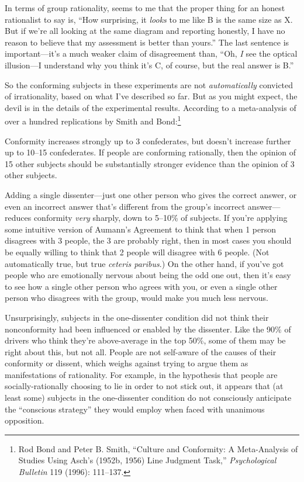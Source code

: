 {
 In terms of group rationality, seems to me that the proper thing
for an honest rationalist to say is, ``How surprising,
it \textit{looks} to me like B is the same size as X. But if
we're all looking at the same diagram and reporting
honestly, I have no reason to believe that my assessment is better than
yours.'' The last sentence is
important---it's a much weaker claim of disagreement
than, ``Oh, \textit{I} see the optical illusion---I
understand why you think it's C, of course, but the
real answer is B.''}

{
 So the conforming subjects in these experiments are not
\textit{automatically} convicted of irrationality, based on what
I've described so far. But as you might expect, the
devil is in the details of the experimental results. According to a
meta-analysis of over a hundred replications by Smith and
Bond:\footnote{Rod Bond and Peter B. Smith, ``Culture and
Conformity: A Meta-Analysis of Studies Using Asch's
(1952b, 1956) Line Judgment Task,''
\textit{Psychological Bulletin} 119 (1996): 111--137.}}

{
 Conformity increases strongly up to 3 confederates, but
doesn't increase further up to 10--15 confederates. If
people are conforming rationally, then the opinion of 15 other subjects
should be substantially stronger evidence than the opinion of 3 other
subjects.}

{
 Adding a single dissenter---just one other person who gives the
correct answer, or even an incorrect answer that's
different from the group's incorrect answer---reduces
conformity \textit{very} sharply, down to 5--10\% of subjects. If
you're applying some intuitive version of
Aumann's Agreement to think that when 1 person
disagrees with 3 people, the 3 are probably right, then in most cases
you should be equally willing to think that 2 people will disagree with
6 people. (Not automatically true, but true \textit{ceteris paribus}.)
On the other hand, if you've got people who are
emotionally nervous about being the odd one out, then
it's easy to see how a single other person who agrees
with you, or even a single other person who disagrees with the group,
would make you much less nervous.}

{
 Unsurprisingly, subjects in the one-dissenter condition did not
think their nonconformity had been influenced or enabled by the
dissenter. Like the 90\% of drivers who think they're
above-average in the top 50\%, some of them may be right about this,
but not all. People are not self-aware of the causes of their
conformity or dissent, which weighs against trying to argue them as
manifestations of rationality. For example, in the hypothesis that
people are socially-rationally choosing to lie in order to not stick
out, it appears that (at least some) subjects in the one-dissenter
condition do not consciously anticipate the
``conscious strategy'' they would
employ when faced with unanimous opposition.}

